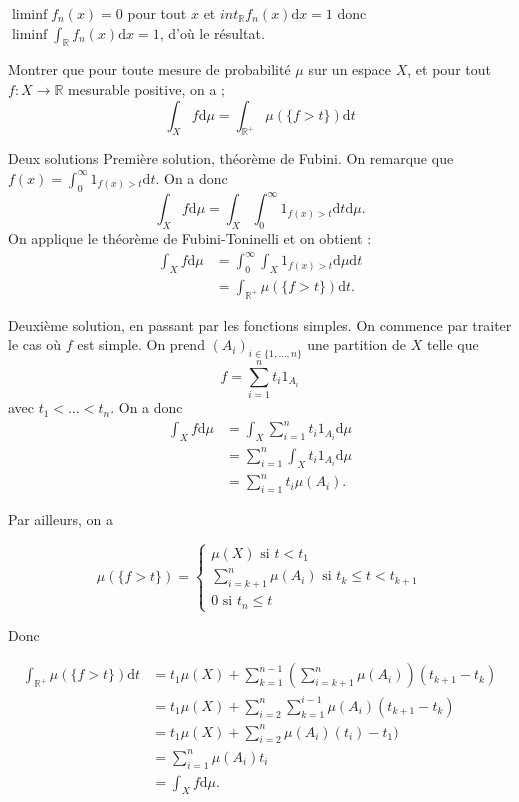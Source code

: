 \documentclass[11pt, answers]{exam}
\newcommand{\R}{\mathbb R}            %
\begin{document}
\begin{questions}
\begin{solution}
$\liminf f_n (x) =0$ pour tout $x$ et $int_\mathbb{R} f_n(x) \mathrm{d}x =1$ donc $\liminf \int_\mathbb{R} f_n(x) \mathrm{d}x =1$, d'où le résultat.
\end{solution}

\question Montrer que pour toute mesure de probabilité $\mu$ sur un espace $X$, et pour tout $f \colon X \to \R$ mesurable positive, on a ;
\[ \int_X f \mathrm{d}\mu = \int_{\mathbb{R}^+} \mu(\{f>t\}) \mathrm{d}t \]


\begin{solution}Deux solutions
Première solution, théorème de Fubini. On remarque que $f(x)=\int_0^\infty 1_{f(x)>t} \mathrm{d} t$. On a donc 
\[\int_X f \mathrm{d}\mu = \int_X \int_0^\infty 1_{f(x)>t} \mathrm{d} t \mathrm{d}\mu. \]
On applique le théorème de Fubini-Toninelli et on obtient :
\begin{align*}
\int_X f \mathrm{d}\mu &= \int_0^\infty \int_X 1_{f(x)>t} \mathrm{d}\mu \mathrm{d} t \\
&=\int_{\mathbb{R}^+} \mu(\{f>t\}) \mathrm{d}t.
\end{align*}

Deuxième solution, en passant par les fonctions simples. On commence par traiter le cas où $f$ est simple. On prend $(A_i)_{i\in \{1,\ldots,n\}}$ une partition de $X$ telle que
\[f = \sum_{i=1}^n t_i 1_{A_i}
\]
avec $t_1<\ldots <t_n$.
On a donc
\begin{align*}
\int_X f \mathrm{d}\mu &= \int_X \sum_{i=1}^n t_i 1_{A_i}  \mathrm{d}\mu \\
&= \sum_{i=1}^n\int_X t_i 1_{A_i}  \mathrm{d}\mu \\
&=\sum_{i=1}^n t_i \mu(A_i).
\end{align*}

Par ailleurs, on a 

\[ \mu(\{f>t\})=
\left \{
  \begin{array}{l}
  \mu(X) \text{ si } t< t_1  \\
  \sum_{i=k+1}^n \mu(A_i) \text{ si } t_k\leq t < t_{k+1} \\
  0 \text{ si } t_n \leq t 
  \end{array}
\right.
\]

Donc

\begin{align*}
\int_{\R^+} \mu(\{f>t\}) \mathrm{d}t &= t_1 \mu(X) + \sum_{k=1}^{n-1} \left(\sum_{i=k+1}^n\mu(A_i) \right) (t_{k+1}-t_k) \\
&= t_1 \mu(X)+ \sum_{i=2}^n \sum_{k=1}^{i-1}\mu(A_i) (t_{k+1}-t_k) \\
&= t_1 \mu(X) + \sum_{i=2}^n \mu(A_i)(t_i)-t_1) \\
&= \sum_{i=1}^n \mu(A_i)t_i \\
&= \int_X f\mathrm{d}\mu.
\end{align*}


\end{solution}
\end{questions}
\end{document}
